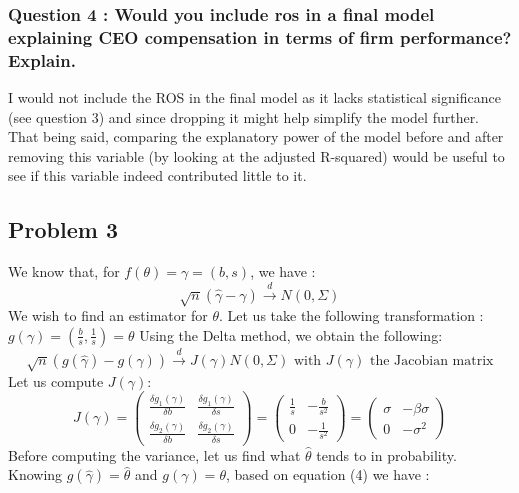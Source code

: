 \documentclass{article}
\begin{document}
\subsubsection{Question 4 : Would you include ros in a final model explaining CEO compensation in terms of firm performance? Explain.}
I would not include the ROS in the final model as it lacks statistical significance (see question 3) and since dropping it might help simplify the model further.
That being said, comparing the explanatory power of the model before and after removing this variable (by looking at the adjusted R-squared) would be useful to see if this variable indeed contributed little to it. 

\subsection{Problem 3}
We know that, for $f(\theta) = \gamma = (b,s)$, we have : 
\begin{equation}
    \sqrt{n}(\hat{\gamma}-\gamma) \xrightarrow{d} N(0,\Sigma)
\end{equation}
We wish to find an estimator for $\theta$. Let us take the following transformation : $g(\gamma) = (\frac{b}{s},\frac{1}{s})= \theta$
Using the Delta method, we obtain the following:
\begin{equation}
    \sqrt{n}(g(\hat{\gamma})-g(\gamma)) \xrightarrow{d} J(\gamma)N(0,\Sigma) \text{ with }J(\gamma)\text{ the Jacobian matrix}
\end{equation}
Let us compute $J(\gamma)$: 
\begin{equation}
    J(\gamma) = \begin{pmatrix}
        \frac{\delta g_1(\gamma)}{\delta b} & \frac{\delta g_1(\gamma)}{\delta s} \\
        \frac{\delta g_2(\gamma)}{\delta b} & \frac{\delta g_2(\gamma)}{\delta s}
    \end{pmatrix} = \begin{pmatrix}
        \frac{1}{s} & -\frac{b}{s^2}\\
        0 & -\frac{1}{s^2} \end{pmatrix} = \begin{pmatrix}
            \sigma & -\beta \sigma\\
            0 & -\sigma^2
    \end{pmatrix}
\end{equation}
Before computing the variance, let us find what $\hat{\theta}$ tends to in probability. Knowing $g(\hat{\gamma}) = \hat{\theta}$ and $g(\gamma) = \theta$, based on equation (4) we have : 
\end{document}

